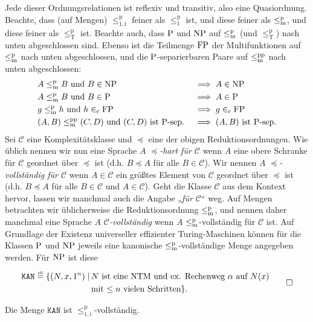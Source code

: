 Jede dieser Ordnungsrelationen ist reflexiv und transitiv, also eine Quasiordnung.
Beachte, dass (auf Mengen) $\leq_\mathrm{1,i}^\mathrm{p}$ feiner als $\leq_1^\mathrm{p}$ ist, und diese feiner als $\leqmp$, und diese feiner als $\leq_\mathrm{T}^\mathrm p$ ist.
Beachte auch, dass $\P$ und $\NP$ auf $\leqmp$ (und $\leq_\mathrm T^\mathrm p$) nach unten abgeschlossen sind.
Ebenso ist die Teilmenge $\FP$ der Multifunktionen auf $\leqmp$ nach unten abgeschlossen, und die $\P$-separierbaren Paare auf $\leqmpp$ nach unten abgeschlossen:
\begin{alignat*}{2}
    &A\leqmp B \text{ und } B\in\NP &&\implies A\in\NP\\
    &A\leqmp B \text{ und } B\in\P &&\implies A\in\P\\
    &g\leqmp h \text{ und } h\inc\FP &&\implies g\inc\FP\\
    &(A,B)\leqmpp (C,D) \text{ und $(C,D)$ ist $\P$-sep.} &&\implies \text{$(A,B)$ ist $\P$-sep.}
\end{alignat*}
Sei $\mathcal C$ eine Komplexitätsklasse und $\preceq$ eine der obigen Reduktionsordnungen.
Wie üblich nennen wir nun eine Sprache $A$ \emph{$\preceq$-hart für $\mathcal C$} wenn $A$ eine obere Schranke für $\mathcal C$ geordnet über $\preceq$  ist (d.h. $B\preceq A$ für alle $B\in\mathcal C$).
Wir nennen $A$ \emph{$\preceq$-vollständig für $\mathcal C$} wenn $A\in\mathcal C$ ein größtes Element von $\mathcal C$ geordnet über $\preceq$ ist (d.h. $B\preceq A$ für alle $B\in\mathcal C$ und $A\in\mathcal C$). 
Geht die Klasse $\mathcal C$ aus dem Kontext hervor, lassen wir manchmal auch die Angabe „\emph{für $\mathcal C$}“ weg.
Auf Mengen betrachten wir üblicherweise die Reduktionsordnung $\leqmp$, und nennen daher manchmal eine Sprache $A$ \emph{$\mathcal C$-vollständig} wenn $A$ $\leqmp$-vollständig für $\mathcal C$ ist.
Auf Grundlage der Existenz universeller effizienter Turing-Maschinen können für die Klassen $\P$ und $\NP$ jeweils eine kanonische $\leqmp$-vollständige Menge angegeben werden. Für $\NP$ ist diese
\begin{definition}
    \[ \begin{split} \mathtt{KAN} \defeq \{ (N, x, 1^n) \mid \,&\text{$N$ ist eine NTM und ex. Rechenweg $\alpha$ auf $N(x)$}\\ &\text{mit $\leq n$ vielen Schritten} \}. \end{split} \qedhere \]
\end{definition}
\begin{lemma}
    Die Menge $\mathtt{KAN}$ ist $\leq_\mathrm{1,i}^\mathrm{p}$-vollständig.
\end{lemma}
